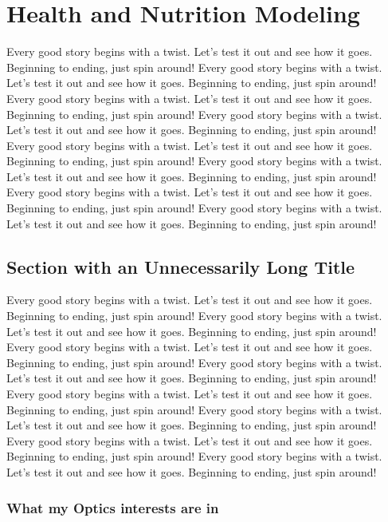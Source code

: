 \chapter{Health and Nutrition Modeling}

Every good story begins with a twist. Let's test it out and see how it goes. Beginning to ending, just spin around! Every good story begins with a twist. Let's test it out and see how it goes. Beginning to ending, just spin around! Every good story begins with a twist. Let's test it out and see how it goes. Beginning to ending, just spin around! Every good story begins with a twist. Let's test it out and see how it goes. Beginning to ending, just spin around! Every good story begins with a twist. Let's test it out and see how it goes. Beginning to ending, just spin around! Every good story begins with a twist. Let's test it out and see how it goes. Beginning to ending, just spin around! Every good story begins with a twist. Let's test it out and see how it goes. Beginning to ending, just spin around! Every good story begins with a twist. Let's test it out and see how it goes. Beginning to ending, just spin around!

\section[What my Optics Studies have been]{Section with an Unnecessarily Long Title}

Every good story begins with a twist. Let's test it out and see how it goes. Beginning to ending, just spin around! Every good story begins with a twist. Let's test it out and see how it goes. Beginning to ending, just spin around! Every good story begins with a twist. Let's test it out and see how it goes. Beginning to ending, just spin around! Every good story begins with a twist. Let's test it out and see how it goes. Beginning to ending, just spin around! Every good story begins with a twist. Let's test it out and see how it goes. Beginning to ending, just spin around! Every good story begins with a twist. Let's test it out and see how it goes. Beginning to ending, just spin around! Every good story begins with a twist. Let's test it out and see how it goes. Beginning to ending, just spin around! Every good story begins with a twist. Let's test it out and see how it goes. Beginning to ending, just spin around!

\subsection{What my Optics interests are in}


